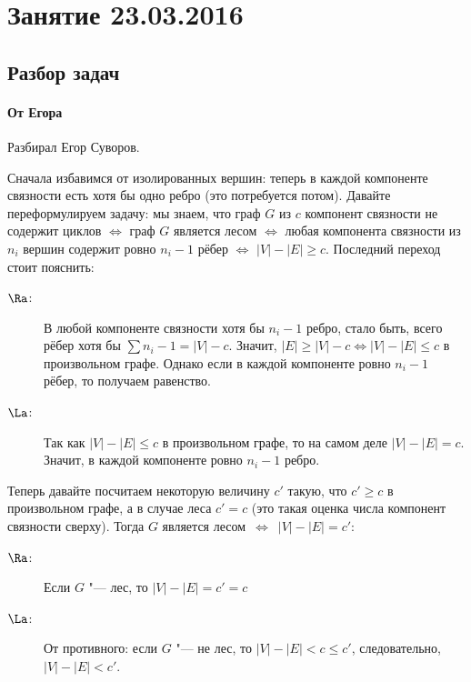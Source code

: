 \chapter{Занятие 23.03.2016}

\section{Разбор задач}
	\subsubsection{От Егора}
		Разбирал Егор Суворов.

		Сначала избавимся от изолированных вершин: теперь в каждой компоненте связности есть хотя бы
		одно ребро (это потребуется потом).
		Давайте переформулируем задачу: мы знаем, что граф $G$ из $c$ компонент связности не содержит циклов
		$\iff$ граф $G$ является лесом
		$\iff$ любая компонента связности из $n_i$ вершин содержит ровно $n_i-1$ рёбер
		$\iff$ $|V|-|E|\ge c$.
		Последний переход стоит пояснить:
		\begin{description}
			\item[$\Ra$:]
				В любой компоненте связности хотя бы $n_i-1$ ребро, стало быть,
				всего рёбер хотя бы $\sum n_i-1 = |V|-c$.
				Значит, $|E|\ge|V|-c \iff |V|-|E|\le c$ в произвольном графе.
				Однако если в каждой компоненте ровно $n_i-1$ рёбер, то получаем равенство.
			\item[$\La$:]
				Так как $|V|-|E|\le c$ в произвольном графе, то на самом деле $|V|-|E|=c$.
				Значит, в каждой компоненте ровно $n_i-1$ ребро.
		\end{description}

		Теперь давайте посчитаем некоторую величину $c'$ такую, что $c' \ge c$ в произвольном графе,
		а в случае леса $c'=c$ (это такая оценка числа компонент связности сверху).
		Тогда $G$ является лесом~$\iff$~$|V|-|E| = c'$:
		\begin{description}
			\item[$\Ra$:]
				Если $G$ "--- лес, то $|V|-|E|=c'=c$
			\item[$\La$:]
				От противного: если $G$ "--- не лес, то $|V|-|E| < c \le c'$, следовательно,
				$|V|-|E| < c'$.
		\end{description}

